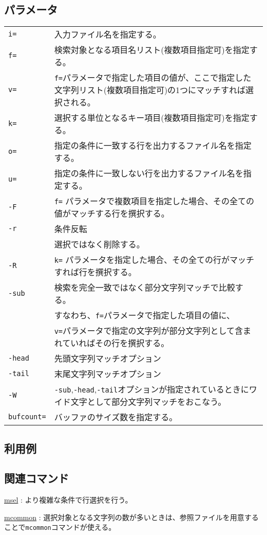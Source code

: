 \subsection*{パラメータ}
\begin{table}[htbp]
{\small
\begin{tabular}{ll}
\verb|i=|    & 入力ファイル名を指定する。\\
\verb|f=|    & 検索対象となる項目名リスト(複数項目指定可)を指定する。\\
\verb|v=|    & \verb|f=|パラメータで指定した項目の値が、ここで指定した文字列リスト(複数項目指定可)の1つにマッチすれば選択される。 \\
\verb|k=|    & 選択する単位となるキー項目(複数項目指定可)を指定する。\\
\verb|o=|    & 指定の条件に一致する行を出力するファイル名を指定する。 \\
\verb|u=|    & 指定の条件に一致しない行を出力するファイル名を指定する。\\
\verb|-F|    & \verb|f=| パラメータで複数項目を指定した場合、その全ての値がマッチする行を撰択する。\\
\verb|-r|    & 条件反転\\
             & 選択ではなく削除する。\\
\verb|-R|    & \verb|k=| パラメータを指定した場合、その全ての行がマッチすれば行を撰択する。\\
\verb|-sub|  & 検索を完全一致ではなく部分文字列マッチで比較する。\\
             & すなわち、\verb|f=|パラメータで指定した項目の値に、\\
             & \verb|v=|パラメータで指定の文字列が部分文字列として含まれていればその行を撰択する。\\
\verb|-head| & 先頭文字列マッチオプション\\
\verb|-tail| & 末尾文字列マッチオプション\\
\verb|-W|    & \verb|-sub|,\verb|-head|,\verb|-tail|オプションが指定されているときにワイド文字として部分文字列マッチをおこなう。\\
\verb|bufcount=| & バッファのサイズ数を指定する。 \\
\end{tabular} 
}
\end{table} 

\subsection*{利用例}

\subsection*{関連コマンド}
\hyperref[sect:msel] {msel} : より複雑な条件で行選択を行う。

\hyperref[sect:mcommon] {mcommon} : 選択対象となる文字列の数が多いときは、参照ファイルを用意することで\verb|mcommon|コマンドが使える。

%
